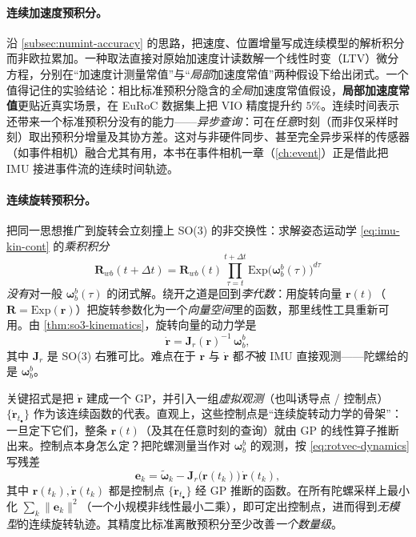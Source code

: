 \paragraph{连续加速度预积分。}
沿 \cref{subsec:numint-accuracy} 的思路，把速度、位置增量写成连续模型的解析积分而非欧拉累加。一种取法直接对原始加速度计读数解一个线性时变（LTV）微分方程，分别在“加速度计测量常值”与“\emph{局部}加速度常值”两种假设下给出闭式\cite{legentil2020idol}。一个值得记住的实验结论：相比标准预积分隐含的\emph{全局}加速度常值假设，\textbf{局部加速度常值}更贴近真实场景，在 EuRoC 数据集上把 VIO 精度提升约 $5\%$\cite{carlone2026handbook}。连续时间表示还带来一个标准预积分没有的能力——\emph{异步查询}：可在\emph{任意}时刻（而非仅采样时刻）取出预积分增量及其协方差。这对与非硬件同步、甚至完全异步采样的传感器（如事件相机）融合尤其有用，本书在事件相机一章（\cref{ch:event}）正是借此把 IMU 接进事件流的连续时间轨迹。

\paragraph{连续旋转预积分。}
把同一思想推广到旋转会立刻撞上 SO(3) 的非交换性：求解姿态运动学 \cref{eq:imu-kin-cont} 的\emph{乘积积分}
\begin{equation}
  \mathbf R_{wb}(t{+}\Delta t)=\mathbf R_{wb}(t)\prod_{\tau=t}^{t+\Delta t}\mathrm{Exp}\big(\boldsymbol\omega_b^b(\tau)\big)^{d\tau}
  \label{eq:product-integral}
\end{equation}
\emph{没有}对一般 $\boldsymbol\omega_b^b(\tau)$ 的闭式解\cite{carlone2026handbook}。绕开之道是回到\emph{李代数}：用旋转向量 $\mathbf r(t)$（$\mathbf R=\mathrm{Exp}(\mathbf r)$）把旋转参数化为一个\emph{向量空间}里的函数，那里线性工具重新可用。由 \cref{thm:so3-kinematics}，旋转向量的动力学是
\begin{equation}
  \dot{\mathbf r}=\mathbf J_r(\mathbf r)^{-1}\,\boldsymbol\omega_b^b,
  \label{eq:rotvec-dynamics}
\end{equation}
其中 $\mathbf J_r$ 是 SO(3) 右雅可比。难点在于 $\mathbf r$ 与 $\dot{\mathbf r}$ 都\emph{不}被 IMU 直接观测——陀螺给的是 $\boldsymbol\omega_b^b$。

\begin{derivation}
关键招式是把 $\dot{\mathbf r}$ 建成一个 GP，并引入一组\emph{虚拟观测}（也叫诱导点 / 控制点）$\{\dot{\mathbf r}_{t_\bullet}\}$ 作为该连续函数的代表\cite{legentil2021latent}。直观上，这些控制点是“连续旋转动力学的骨架”：一旦定下它们，整条 $\mathbf r(t)$（及其在任意时刻的查询）就由 GP 的线性算子推断出来。控制点本身怎么定？把陀螺测量当作对 $\boldsymbol\omega_b^b$ 的观测，按 \cref{eq:rotvec-dynamics} 写残差
\[
  \mathbf e_k=\tilde{\boldsymbol\omega}_k-\mathbf J_r\big(\mathbf r(t_k)\big)\,\dot{\mathbf r}(t_k),
\]
其中 $\mathbf r(t_k),\dot{\mathbf r}(t_k)$ 都是控制点 $\{\dot{\mathbf r}_{t_\bullet}\}$ 经 GP 推断的函数。在所有陀螺采样上最小化 $\sum_k\|\mathbf e_k\|^2$（一个小规模非线性最小二乘），即可定出控制点，进而得到\emph{无模型}的连续旋转轨迹。其精度比标准离散预积分至少改善\emph{一个数量级}\cite{carlone2026handbook}。
\end{derivation}

